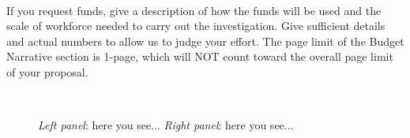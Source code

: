 \documentclass[letterpaper,11pt]{article}
\begin{document}
\smallskip\\
If you request funds, give a description of how the funds will be used and the scale of workforce needed 
to carry out the investigation. Give sufficient details and actual numbers to allow us to judge your effort. 
The page limit of the Budget Narrative section is 1-page, which will NOT count toward the overall page limit of your proposal. 


\begin{figure}[htp!]
\begin{center}
\hbox{
\hspace{0.5cm}
}
\end{center}
\caption{\footnotesize
{{\it Left panel}: here you see...
{\it Right panel}: here you see...}}
\label{fig1}
\end{figure}
\end{document}
